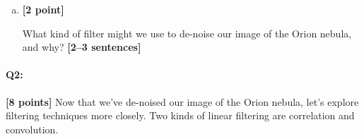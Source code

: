 \documentclass[11pt]{article}
\begin{document}
\begin{enumerate}[(a)]

\item \textbf{[2 point]}
\begin{tcolorbox}[colback=orange!5!white,colframe=orange!75!black]
What kind of filter might we use to de-noise our image of the Orion nebula, and why? \textbf{[2--3 sentences]}
\end{tcolorbox}

\pagebreak


\end{enumerate}


\pagebreak
\paragraph{Q2:} \textbf{[8 points]} Now that we've de-noised our image of the Orion nebula, let's explore filtering techniques more closely. Two kinds of linear filtering are correlation and convolution.
\end{document}
